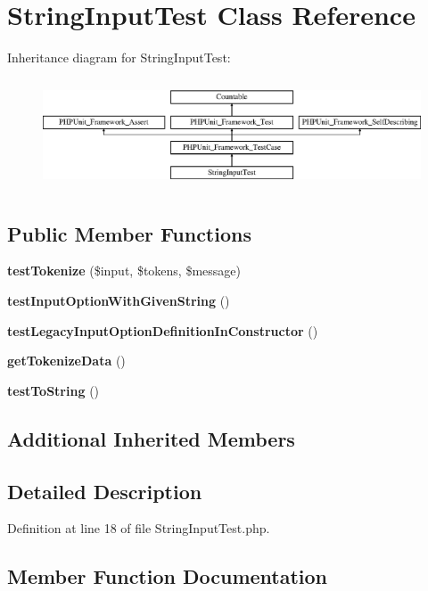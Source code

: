 \section{String\+Input\+Test Class Reference}
\label{class_symfony_1_1_component_1_1_console_1_1_tests_1_1_input_1_1_string_input_test}
Inheritance diagram for String\+Input\+Test\+:\begin{figure}[H]
\begin{center}
\leavevmode
\includegraphics[height=3.303835cm]{class_symfony_1_1_component_1_1_console_1_1_tests_1_1_input_1_1_string_input_test}
\end{center}
\end{figure}
\subsection*{Public Member Functions}
\begin{DoxyCompactItemize}
\item 
{\bf test\+Tokenize} (\$input, \$tokens, \$message)
\item 
{\bf test\+Input\+Option\+With\+Given\+String} ()
\item 
{\bf test\+Legacy\+Input\+Option\+Definition\+In\+Constructor} ()
\item 
{\bf get\+Tokenize\+Data} ()
\item 
{\bf test\+To\+String} ()
\end{DoxyCompactItemize}
\subsection*{Additional Inherited Members}


\subsection{Detailed Description}


Definition at line 18 of file String\+Input\+Test.\+php.



\subsection{Member Function Documentation}
